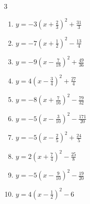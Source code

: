 \begin{multicols}{3}
\begin{enumerate}
  \item $\displaystyle y=-3\left( x+\frac{2}{3}\right)^{2}+\frac{31}{3}$


  \item $\displaystyle y=-7\left( x+\frac{1}{2}\right)^{2}-\frac{13}{4}$


\columnbreak %

  \item $\displaystyle y=-9\left( x-\frac{7}{18}\right)^{2}+\frac{49}{36}$


  \item $\displaystyle y=4\left( x-\frac{3}{4}\right)^{2}+\frac{27}{4}$


  \item $\displaystyle y=-8\left( x+\frac{7}{16}\right)^{2}-\frac{79}{32}$


  \item $\displaystyle y=-5\left( x-\frac{3}{10}\right)^{2}-\frac{171}{20}$


  \item $\displaystyle y=-5\left( x-\frac{2}{5}\right)^{2}+\frac{24}{5}$


  \item $\displaystyle y=2\left( x+\frac{7}{4}\right)^{2}-\frac{25}{8}$


  \item $\displaystyle y=-5\left( x-\frac{9}{10}\right)^{2}-\frac{19}{20}$


  \item $\displaystyle y=4\left( x-\frac{1}{2}\right)^{2}-6$


\end{enumerate}
\end{multicols}
